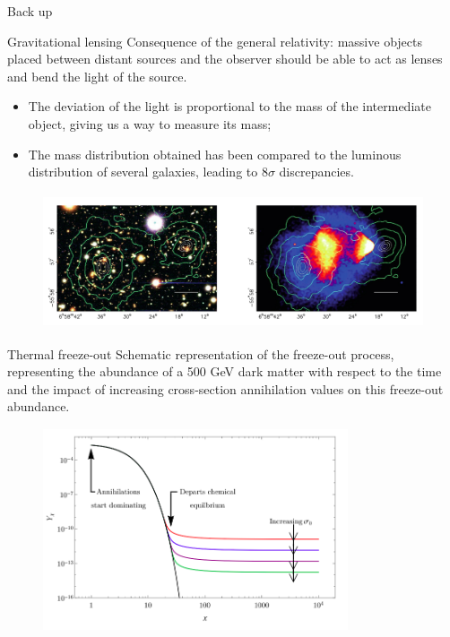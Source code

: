 \documentclass[8pt]{beamer}
\newcommand{\backupbegin}{
   \newcounter{finalframe}
   \setcounter{finalframe}{\value{framenumber}}
}
\begin{document}
\backupbegin

\begin{frame}[standout]
Back up
\end{frame}

\begin{frame}{Gravitational lensing}
\justifying
\vspace{5pt}
Consequence of the general relativity: massive objects placed between distant sources and the observer should be able to act as lenses and bend the light of the source. \vfill

\begin{itemize}
\justifying
\item The deviation of the light is proportional to the mass of the intermediate object, giving us a way to measure its mass;
\item The mass distribution obtained has been compared to the luminous distribution of several galaxies, leading to $8\sigma$ discrepancies. %
\end{itemize} \vfill

\vspace{-5pt}
\begin{figure}[htbp]
\begin{center}
\includegraphics[width=11	cm, height=4cm]{figs/BulletCluster.png}
\end{center}
\end{figure} \vfill
\end{frame}

\begin{frame}{Thermal freeze-out}
\justifying
\vspace{5pt}
Schematic representation of the freeze-out process, representing the abundance of a
500 GeV dark matter with respect to the time and the impact of increasing cross-section annihilation
values on this freeze-out abundance. \vfill

\begin{figure}[htbp]
\begin{center}
\includegraphics[width=9cm, height=6cm]{figs/FreezeOut.png}
\end{center}
\end{figure} \vfill
\end{frame}
\end{document}
